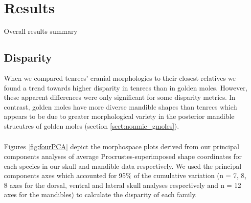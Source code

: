\chapter{Results}
\label{chap:results}



\noindent
Overall results summary

\section{Disparity} %

	When we compared tenrecs’ cranial morphologies to their closest relatives we found a trend towards higher disparity in tenrecs than
	in golden moles. However, these apparent differences were only
	significant for some disparity metrics. In contrast, golden moles have more diverse mandible shapes than tenrecs which appears to be due to greater morphological variety in the posterior mandible strucutres of golden moles (section \ref{sect:nonmic_gmoles}).

\subsection{}
	Figures  \ref{fig:fourPCA} depict the morphospace plots derived from our principal components analyses of average Procrustes-superimposed shape coordinates for each species in our skull and mandible data respectively. We used the principal components axes which accounted for 95\% of the cumulative variation (n = 7, 8, 8 axes for the dorsal, ventral and lateral skull analyses respectively and n = 12 axes for the mandibles) to calculate the disparity of each family. 


